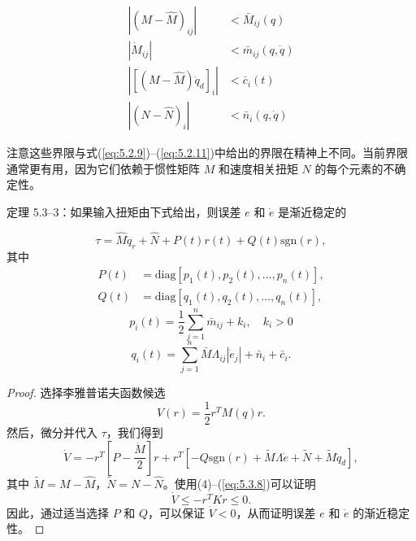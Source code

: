 \documentclass[UTF8,12pt,a4paper]{ctexart}
\begin{document}
\begin{equation}\label{eq:5.3.7}
\begin{aligned}
|(M - \hat{M})_{ij}| &< \bar{M}_{ij}(q) \\
|\dot{M}_{ij}| &< \bar{m}_{ij}(q, \dot{q}) \\
|[(M - \hat{M})\ddot{q}_d]_i| &< \bar{c}_i(t) \\
|(N - \hat{N})_i| &< \bar{n}_i(q, \dot{q})
\end{aligned}
\end{equation}

注意这些界限与式(\ref{eq:5.2.9})--(\ref{eq:5.2.11})中给出的界限在精神上不同。当前界限通常更有用，因为它们依赖于惯性矩阵 $M$ 和速度相关扭矩 $N$ 的每个元素的不确定性。

\begin{theorem}\label{thm:5.3.3}
定理 5.3--3：如果输入扭矩由下式给出，则误差 $e$ 和 $\dot{e}$ 是渐近稳定的

\begin{equation}
\tau = \hat{M}\ddot{q}_r + \hat{N} + P(t)r(t) + Q(t)\text{sgn}(r),
\end{equation}
其中
\begin{equation}
\begin{aligned}
P(t) &= \text{diag}[p_1(t), p_2(t), \ldots, p_n(t)], \\
Q(t) &= \text{diag}[q_1(t), q_2(t), \ldots, q_n(t)],
\end{aligned}
\end{equation}
\begin{equation}
p_i(t) = \frac{1}{2}\sum_{j=1}^{n}\bar{m}_{ij} + k_i, \quad k_i > 0
\end{equation}
\begin{equation}
q_i(t) = \sum_{j=1}^{n}\bar{M}\Lambda_{ij}|\dot{e}_j| + \bar{n}_i + \bar{c}_i.
\end{equation}
\end{theorem}

\begin{proof}
选择李雅普诺夫函数候选
\begin{equation}
V(r) = \frac{1}{2}r^T M(q)r.
\end{equation}
然后，微分并代入 $\tau$，我们得到
\begin{equation}
\dot{V} = -r^T\left[P - \frac{\dot{M}}{2}\right]r + r^T[-Q\text{sgn}(r) + \tilde{M}\Lambda\dot{e} + \tilde{N} + \tilde{M}\ddot{q}_d],
\end{equation}
其中 $\tilde{M} = M - \hat{M}$，$\tilde{N} = N - \hat{N}$。使用(4)--(\ref{eq:5.3.8})可以证明
\begin{equation}
\dot{V} \leq -r^T K r \leq 0.
\end{equation}
因此，通过适当选择 $P$ 和 $Q$，可以保证 $\dot{V} < 0$，从而证明误差 $e$ 和 $\dot{e}$ 的渐近稳定性。
\end{proof}
\end{document}
